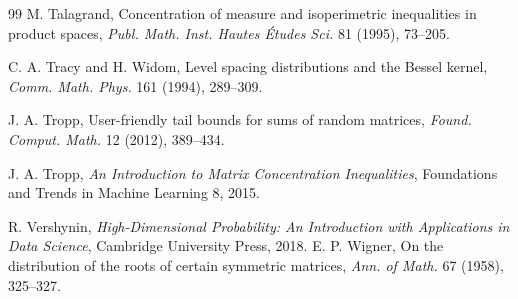 \documentclass[11pt]{article}
\theoremstyle{definition}
\begin{document}
\begin{thebibliography}{99}
 M. Talagrand, Concentration of measure and isoperimetric inequalities in
product spaces, \emph{Publ. Math. Inst. Hautes \'Etudes Sci.} 81 (1995), 73--205.

 C. A. Tracy and H. Widom, Level spacing distributions and the Bessel kernel,
\emph{Comm. Math. Phys.} 161 (1994), 289--309.


 J. A. Tropp, User-friendly tail bounds for sums of random matrices, \emph{Found. Comput. Math.} 12 (2012), 389--434.

 J. A. Tropp, \emph{An Introduction to Matrix Concentration Inequalities}, Foundations and Trends in Machine Learning 8, 2015.

 R. Vershynin, \emph{High-Dimensional Probability: An Introduction with Applications in Data Science}, Cambridge University Press, 2018.
 E. P. Wigner, On the distribution of the roots of certain symmetric matrices,
\emph{Ann. of Math.} 67 (1958), 325--327.

\end{thebibliography}
\end{document}
